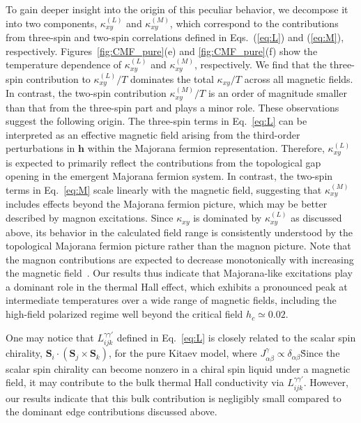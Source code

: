 \documentclass[twocolumn,superscriptaddress,showpacs, longbibliography, aps, prx]{revtex4-2}
\begin{document}
To gain deeper insight into the origin of this peculiar behavior, we decompose it into two components, $\kappa_{xy}^{(L)}$ and  $\kappa_{xy}^{(M)}$, which correspond to the contributions from three-spin and two-spin correlations defined in Eqs.~(\ref{eq:L}) and (\ref{eq:M}), respectively.
Figures~\ref{fig:CMF_pure}(e) and \ref{fig:CMF_pure}(f) show the temperature dependence of $\kappa_{xy}^{(L)}$ and  $\kappa_{xy}^{(M)}$, respectively.
We find that the three-spin contribution to $\kappa_{xy}^{(L)}/T$ dominates the total $\kappa_{xy}/T$ across all magnetic fields.
In contrast, the two-spin contribution $\kappa_{xy}^{(M)}/T$ is an order of magnitude smaller than that from the three-spin part and plays a minor role.
These observations suggest the following origin. 
The three-spin terms in Eq.~\eqref{eq:L} can be interpreted as an effective magnetic field arising from the third-order perturbations in $\bm{h}$ within the Majorana fermion representation. 
Therefore, $\kappa_{xy}^{(L)}$ is expected to primarily reflect the contributions from the topological gap opening in the emergent Majorana fermion system.
In contrast, the two-spin terms in Eq.~\eqref{eq:M} scale linearly with the magnetic field, suggesting that $\kappa_{xy}^{(M)}$ includes effects beyond the Majorana fermion picture, which may be better described by magnon excitations.
Since $\kappa_{xy}$ is dominated by $\kappa_{xy}^{(L)}$ as discussed above, its behavior in the calculated field range is consistently understood by the topological Majorana fermion picture rather than the magnon picture. 
Note that the magnon contributions are expected to decrease monotonically with increasing the magnetic field~\cite{McClartyDGRPMP2018}.
Our results thus indicate that Majorana-like excitations play a dominant role in the thermal Hall effect, which exhibits a pronounced peak at intermediate temperatures over a wide range of magnetic fields, including the high-field polarized regime well beyond the critical field $h_c \simeq 0.02$. 

One may notice that $L_{ijk}^{\gamma\gamma'}$ defined in Eq.~\eqref{eq:L} is closely related to 
the scalar spin chirality, $\bm{S}_i\cdot (\bm{S}_j \times \bm{S}_k)$, for the pure Kitaev model, where $J^\gamma_{\alpha\beta} \propto \delta_{\alpha\beta}$\. 
Since the scalar spin chirality can become nonzero in a chiral spin liquid under a magnetic field, it may contribute to the bulk thermal Hall conductivity via $L_{ijk}^{\gamma\gamma'}$.
However, our results indicate that this bulk contribution is negligibly small compared to the dominant edge contributions discussed above. 
\end{document}
